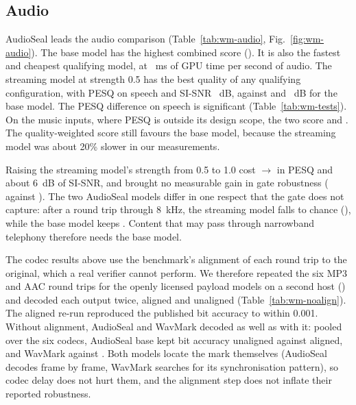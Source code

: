 \subsection{Audio}
\label{sec:wm-res-audio}
AudioSeal leads the audio comparison (Table~\ref{tab:wm-audio}, Fig.~\ref{fig:wm-audio}). The base model has the highest combined score (). It is also the fastest and cheapest qualifying model, at ~ms of GPU time per second of audio. The streaming model at strength 0.5 has the best quality of any qualifying configuration, with PESQ on speech  and SI-SNR ~dB, against  and ~dB for the base model. The PESQ difference on speech is significant (Table~\ref{tab:wm-tests}). On the  music inputs, where PESQ is outside its design scope, the two score  and . The quality-weighted score still favours the base model, because the streaming model was about 20\% slower in our measurements.

Raising the streaming model's strength from 0.5 to 1.0 cost $\to$ in PESQ and about 6~dB of SI-SNR, and brought no measurable gain in gate robustness ( against ). The two AudioSeal models differ in one respect that the gate does not capture: after a round trip through 8~kHz, the streaming model falls to chance (), while the base model keeps . Content that may pass through narrowband telephony therefore needs the base model.

The codec results above use the benchmark's alignment of each round trip to the original, which a real verifier cannot perform. We therefore repeated the six MP3 and AAC round trips for the openly licensed payload models on a second host () and decoded each output twice, aligned and unaligned (Table~\ref{tab:wm-noalign}). The aligned re-run reproduced the published bit accuracy to within 0.001. Without alignment, AudioSeal and WavMark decoded as well as with it: pooled over the six codecs, AudioSeal base kept  bit accuracy unaligned against  aligned, and WavMark  against . Both models locate the mark themselves (AudioSeal decodes frame by frame, WavMark searches for its synchronisation pattern), so codec delay does not hurt them, and the alignment step does not inflate their reported robustness.

